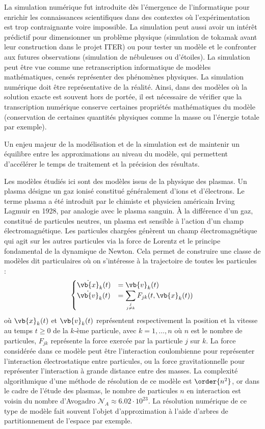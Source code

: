 
La simulation numérique fut introduite dès l’émergence de l’informatique pour enrichir les connaissances scientifiques dans des contextes où l’expérimentation est trop contraignante voire impossible. La simulation peut aussi avoir un intérêt prédictif pour dimensionner un problème physique (simulation de tokamak avant leur construction dans le projet ITER) ou pour tester un modèle et le confronter aux futures observations (simulation de nébuleuses ou d’étoiles). La simulation peut être vue comme une retranscription informatique de modèles mathématiques, censés représenter des phénomènes physiques. La simulation numérique doit être représentative de la réalité. Ainsi, dans des modèles où la solution exacte est souvent hors de portée, il est nécessaire de vérifier que la transcription numérique conserve certaines propriétés mathématiques du modèle (conservation de certaines quantités physiques comme la masse ou l’énergie totale par exemple).

Un enjeu majeur de la modélisation et de la simulation est de maintenir un équilibre entre les approximations au niveau du modèle, qui permettent d’accélérer le temps de traitement et la précision des résultats.

Les modèles étudiés ici sont des modèles issus de la physique des plasmas. Un plasma désigne un gaz ionisé constitué généralement d'ions et d'électrons. Le terme plasma a été introduit par le chimiste et physicien américain Irving Lagmuir en 1928, par analogie avec le plasma sanguin. À la différence d'un gaz, constitué de particules neutres, un plasma est sensible à l'action d'un champ électromagnétique. Les particules chargées génèrent un champ électromagnétique qui agit sur les autres particules via la force de Lorentz et le principe fondamental de la dynamique de Newton. Cela permet de construire une classe de modèles dit particulaires où on s'intéresse à la trajectoire de toutes les particules :
$$
  \begin{cases}
    \dot{\vb{x}}_k(t) &= \vb{v}_k(t) \\
    \dot{\vb{v}}_k(t) &= \displaystyle\sum_{j\atop j\neq k} F_{jk}(t,\vb{x}_k(t))
  \end{cases}
$$
où $\vb{x}_k(t)$ et $\vb{v}_k(t)$ représentent respectivement la position et la vitesse au temps $t\geq0$ de la $k$-ème particule, avec $k=1,\dots,n$ où $n$ est le nombre de particules, $F_{jk}$ représente la force exercée par la particule $j$ sur $k$. La force considérée dans ce modèle peut être l'interaction coulombienne pour représenter l'interaction électrostatique entre particules, ou la force gravitationnelle pour représenter l'interaction à grande distance entre des masses. La complexité algorithmique d'une méthode de résolution de ce modèle est $\order{n^2}$, or dans le cadre de l'étude des plasmas, le nombre de particules $n$ en interaction est voisin du nombre d'Avogadro $\mathcal{N}_A\approx 6.02\cdot 10^{23}$. La résolution numérique de ce type de modèle fait souvent l'objet d'approximation à l'aide d'arbres de partitionnement de l'espace par exemple.

